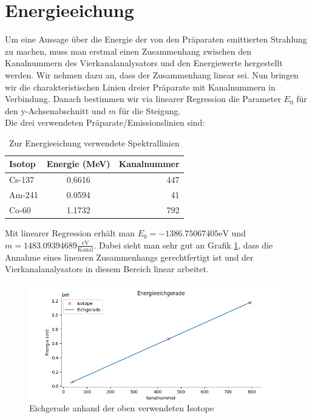 \section{Energieeichung}

Um eine Aussage über die Energie der von den Präparaten emittierten Strahlung zu machen, muss man erstmal einen Zusammenhang zwischen 
den Kanalnummern des Vierkanalanalysators und den Energiewerte hergestellt werden. Wir nehmen dazu an, dass der Zusammenhang linear sei. Nun bringen wir 
die charakteristischen Linien dreier Präparate mit Kanalnummern in Verbindung. Danach bestimmen 
wir via linearer Regression die Parameter $E_0$  für den y-Achsenabschnitt und $m$ für die Steigung.\\

Die drei verwendeten Präparate/Emissionslinien  sind:
 \begin{table}[h]
    \centering
     \begin{tabular}{lcr}
        Isotop & Energie (MeV) & Kanalnummer \\
        \toprule
         Cs-137 & 0,6616  & 447\\
         Am-241 & 0.0594 & 41\\
         Co-60 & 1.1732 & 792\\
     \end{tabular}
     \caption{Zur Energieeichung verwendete Spektrallinien}
     \label{Eichung}
 \end{table}

 Mit linearer Regression erhält man $E_0 = -1386.75067405 \mathrm{ eV}$ und $m = 1483.09394689 \frac{\mathrm{eV}}{\mathrm{Kanal}}$.
 Dabei sieht man sehr gut an Grafik \ref{Eichgerade}, dass die Annahme eines linearen Zusammenhangs gerechtfertigt ist und der Vierkanalanalysators in 
 diesem Bereich linear arbeitet.

 \begin{figure}[ht]
     \centering
     \includegraphics[width = \linewidth]{Bilder/Auswertung/EnergieeichgeradeGamma.png}
     \caption{Eichgerade anhand der oben verwendeten Isotope}
     \label{Eichgerade}
 \end{figure}